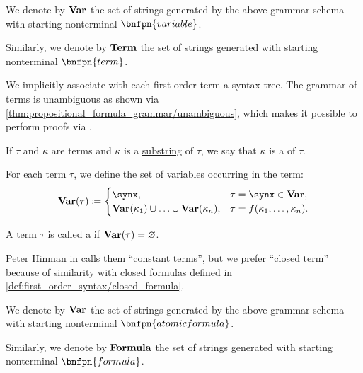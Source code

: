 \begin{definition}
\begin{thmenum}
     We denote by \( \op*{Var} \) the set of strings generated by the above grammar schema with starting nonterminal \( \bnfpn{variable} \).

     Similarly, we denote by \( \op*{Term} \) the set of strings generated with starting nonterminal \( \bnfpn{term} \).

    We implicitly associate with each first-order term a syntax tree. The grammar of terms is unambiguous as shown via \cref{thm:propositional_formula_grammar/unambiguous}, which makes it possible to perform proofs via .

     If \( \tau \) and \( \kappa \) are terms and \( \kappa \) is a \hyperref[def:formal_language/substring]{substring} of \( \tau \), we say that \( \kappa \) is a  of \( \tau \).

     For each term \( \tau \), we define the set of variables occurring in the term:
    \begin{equation}\label{eq:def:first_order_syntax/term_variables}
      \op*{Var}(\tau) \coloneqq \begin{cases}
        \synx,                                                            &\tau = \synx \in \op*{Var}, \\
        \op*{Var}(\kappa_1) \cup \ldots \cup \op*{Var}(\kappa_n), &\tau = f(\kappa_1, \ldots, \kappa_n).
      \end{cases}
    \end{equation}

     A term \( \tau \) is called a  if \( \op*{Var}(\tau) = \varnothing \).

    Peter Hinman in  calls them \enquote{constant terms}, but we prefer \enquote{closed term} because of similarity with closed formulas defined in \cref{def:first_order_syntax/closed_formula}.

     We denote by \( \op*{Var} \) the set of strings generated by the above grammar schema with starting nonterminal \( \bnfpn{atomic formula} \).

     Similarly, we denote by \( \op*{Formula} \) the set of strings generated with starting nonterminal \( \bnfpn{formula} \).


\end{thmenum}
\end{definition}
